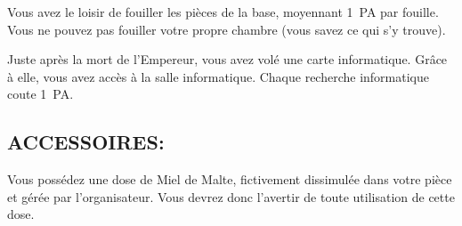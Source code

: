 \documentclass[14pt,twocolumn]{extarticle}
\begin{document}
Vous avez le loisir de fouiller les pièces de la base, moyennant 1~PA par
fouille. Vous ne pouvez pas fouiller votre propre chambre (vous savez ce qui
s'y trouve).

Juste après la mort de l'Empereur, vous avez volé une carte informatique.
Grâce à elle, vous avez accès à la salle informatique. Chaque recherche
informatique coute 1~PA.

\subsection{ACCESSOIRES:}

Vous possédez une dose de Miel de Malte, fictivement dissimulée dans votre
pièce et gérée par l'organisateur. Vous devrez donc l'avertir de toute
utilisation de cette dose.
\end{document}
